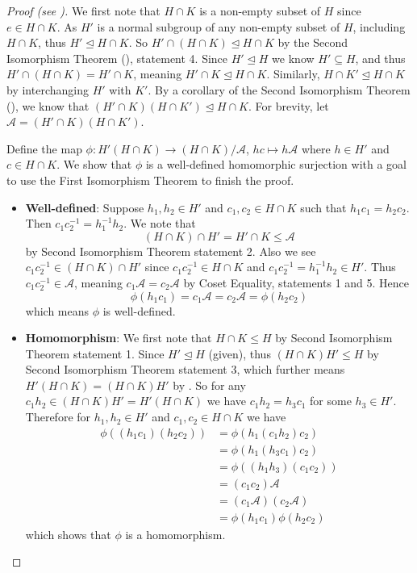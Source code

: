 \begin{proof}[Proof (see {\cite[Lemma I.8.9]{hungerford_1980}})]
    We first note that $H \cap K$ is a non-empty subset of $H$ since $e \in H \cap K$. As $H'$ is a normal subgroup of any non-empty subset of $H$, including $H \cap K$, thus $H' \unlhd H \cap K$. So $H' \cap (H \cap K) \unlhd H \cap K$ by the Second Isomorphism Theorem (), statement 4. Since $H'\unlhd H$ we know $H' \subseteq H$, and thus $H' \cap (H \cap K) = H' \cap K$, meaning $H' \cap K \unlhd H \cap K$. Similarly, $H \cap K' \unlhd H \cap K$ by interchanging $H'$ with $K'$. By a corollary of the Second Isomorphism Theorem (), we know that $(H' \cap K)(H \cap K') \unlhd H \cap K$. For brevity, let $\mathcal{A} = (H' \cap K)(H \cap K')$.

    Define the map $\phi: H'(H\cap K) \to (H\cap K)/\mathcal{A}$, $hc \mapsto h\mathcal{A}$ where $h \in H'$ and $c \in H \cap K$. We show that $\phi$ is a well-defined homomorphic surjection with a goal to use the First Isomorphism Theorem to finish the proof.

    \begin{itemize}
        \item \textbf{Well-defined}: Suppose $h_1, h_2 \in H'$ and $c_1, c_2 \in H \cap K$ such that $h_1c_1 = h_2c_2$. Then $c_1c_2^{-1} = h_1^{-1}h_2$. We note that
        \[
            (H \cap K) \cap H' = H' \cap K \leq \mathcal{A}
        \]
        by Second Isomorphism Theorem statement 2. Also we see $c_1c_2^{-1} \in (H \cap K) \cap H'$ since $c_1c_2^{-1} \in H \cap K$ and $c_1c_2^{-1} = h_1^{-1}h_2 \in H'$. Thus $c_1c_2^{-1} \in \mathcal{A}$, meaning $c_1\mathcal{A} = c_2\mathcal{A}$ by Coset Equality, statements 1 and 5. Hence
        \[
            \phi(h_1c_1) = c_1\mathcal{A} = c_2\mathcal{A} = \phi(h_2c_2)
        \]
        which means $\phi$ is well-defined.

        \item \textbf{Homomorphism}: We first note that $H \cap K \leq H$ by Second Isomorphism Theorem statement 1. Since $H' \unlhd H$ (given), thus $(H\cap K)H' \leq H$ by Second Isomorphism Theorem statement 3, which further means $H'(H\cap K) = (H\cap K)H'$ by . So for any $c_1h_2 \in (H\cap K)H' = H'(H\cap K)$ we have $c_1h_2 = h_3c_1$ for some $h_3 \in H'$. Therefore for $h_1, h_2 \in H'$ and $c_1, c_2 \in H \cap K$ we have
        \begin{align*}
            \phi((h_1c_1)(h_2c_2)) &= \phi(h_1(c_1h_2)c_2)\\
            &= \phi(h_1(h_3c_1)c_2)\\
            &= \phi((h_1h_3)(c_1c_2))\\
            &= (c_1c_2)\mathcal{A}\\
            &= (c_1\mathcal{A})(c_2\mathcal{A})\\
            &= \phi(h_1c_1)\phi(h_2c_2)
        \end{align*}
        which shows that $\phi$ is a homomorphism.


\end{itemize}
\end{proof}

